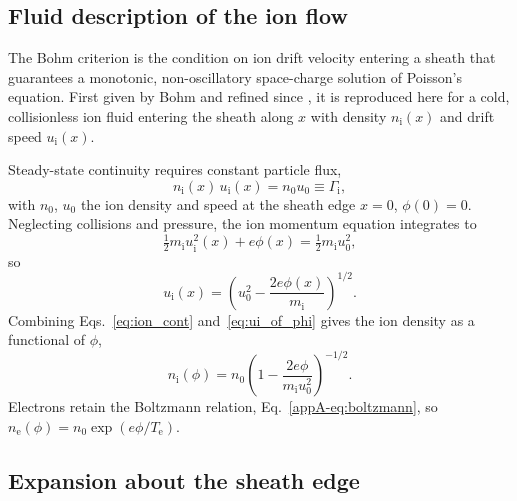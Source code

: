 \subsection{Fluid description of the ion flow}

The Bohm criterion is the condition on ion drift velocity entering a sheath that guarantees a monotonic, non-oscillatory space-charge solution of Poisson's equation. First given by Bohm and refined since \cite{ref0001,ref0004,ref0015}, it is reproduced here for a cold, collisionless ion fluid entering the sheath along $x$ with density $n_{\mathrm{i}}(x)$ and drift speed $u_{\mathrm{i}}(x)$.

Steady-state continuity requires constant particle flux,
\begin{equation}
n_{\mathrm{i}}(x)\,u_{\mathrm{i}}(x) = n_{0}u_{0} \equiv \Gamma_{\mathrm{i}},
\label{eq:ion_cont}
\end{equation}
with $n_{0}$, $u_{0}$ the ion density and speed at the sheath edge $x=0$, $\phi(0)=0$. Neglecting collisions and pressure, the ion momentum equation integrates to
\begin{equation}
\tfrac{1}{2}m_{\mathrm{i}}u_{\mathrm{i}}^{2}(x) + e\phi(x) = \tfrac{1}{2}m_{\mathrm{i}}u_{0}^{2},
\label{eq:ion_energy}
\end{equation}
so
\begin{equation}
u_{\mathrm{i}}(x) = \left(u_{0}^{2} - \frac{2e\phi(x)}{m_{\mathrm{i}}}\right)^{1/2}.
\label{eq:ui_of_phi}
\end{equation}
Combining Eqs.~\eqref{eq:ion_cont} and~\eqref{eq:ui_of_phi} gives the ion density as a functional of $\phi$,
\begin{equation}
n_{\mathrm{i}}(\phi) = n_{0}\left(1 - \frac{2e\phi}{m_{\mathrm{i}}u_{0}^{2}}\right)^{-1/2}.
\label{eq:ni_of_phi}
\end{equation}
Electrons retain the Boltzmann relation, Eq.~\eqref{appA-eq:boltzmann}, so $n_{\mathrm{e}}(\phi) = n_{0}\exp(e\phi/T_{\mathrm{e}})$.

\subsection{Expansion about the sheath edge}

